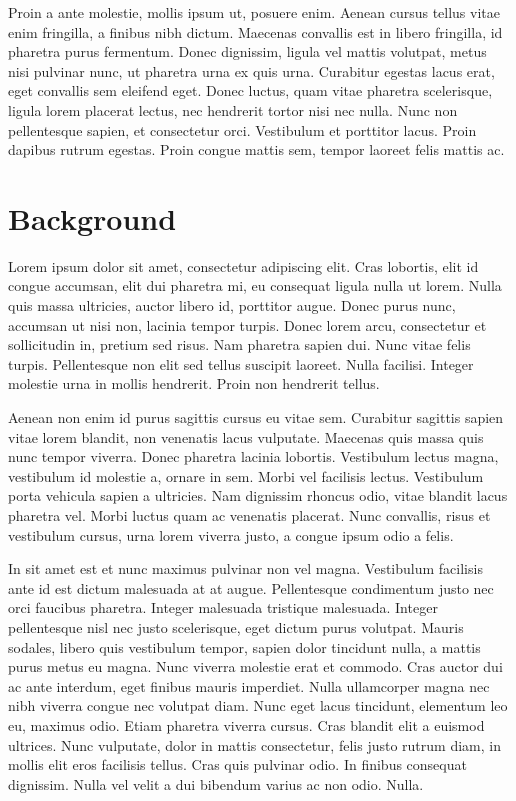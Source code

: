 \documentclass[a4paper]{article}
\begin{document}
Proin a ante molestie, mollis ipsum ut, posuere enim. Aenean cursus tellus vitae enim fringilla, a finibus nibh dictum. Maecenas convallis est in libero fringilla, id pharetra purus fermentum. Donec dignissim, ligula vel mattis volutpat, metus nisi pulvinar nunc, ut pharetra urna ex quis urna. Curabitur egestas lacus erat, eget convallis sem eleifend eget. Donec luctus, quam vitae pharetra scelerisque, ligula lorem placerat lectus, nec hendrerit tortor nisi nec nulla. Nunc non pellentesque sapien, et consectetur orci. Vestibulum et porttitor lacus. Proin dapibus rutrum egestas. Proin congue mattis sem, tempor laoreet felis mattis ac.

\section{Background}



Lorem ipsum dolor sit amet, consectetur adipiscing elit. Cras lobortis, elit id congue accumsan, elit dui pharetra mi, eu consequat ligula nulla ut lorem. Nulla quis massa ultricies, auctor libero id, porttitor augue. Donec purus nunc, accumsan ut nisi non, lacinia tempor turpis. Donec lorem arcu, consectetur et sollicitudin in, pretium sed risus. Nam pharetra sapien dui. Nunc vitae felis turpis. Pellentesque non elit sed tellus suscipit laoreet. Nulla facilisi. Integer molestie urna in mollis hendrerit. Proin non hendrerit tellus.

Aenean non enim id purus sagittis cursus eu vitae sem. Curabitur sagittis sapien vitae lorem blandit, non venenatis lacus vulputate. Maecenas quis massa quis nunc tempor viverra. Donec pharetra lacinia lobortis. Vestibulum lectus magna, vestibulum id molestie a, ornare in sem. Morbi vel facilisis lectus. Vestibulum porta vehicula sapien a ultricies. Nam dignissim rhoncus odio, vitae blandit lacus pharetra vel. Morbi luctus quam ac venenatis placerat. Nunc convallis, risus et vestibulum cursus, urna lorem viverra justo, a congue ipsum odio a felis.

In sit amet est et nunc maximus pulvinar non vel magna. Vestibulum facilisis ante id est dictum malesuada at at augue. Pellentesque condimentum justo nec orci faucibus pharetra. Integer malesuada tristique malesuada. Integer pellentesque nisl nec justo scelerisque, eget dictum purus volutpat. Mauris sodales, libero quis vestibulum tempor, sapien dolor tincidunt nulla, a mattis purus metus eu magna. Nunc viverra molestie erat et commodo. Cras auctor dui ac ante interdum, eget finibus mauris imperdiet. Nulla ullamcorper magna nec nibh viverra congue nec volutpat diam. Nunc eget lacus tincidunt, elementum leo eu, maximus odio. Etiam pharetra viverra cursus. Cras blandit elit a euismod ultrices. Nunc vulputate, dolor in mattis consectetur, felis justo rutrum diam, in mollis elit eros facilisis tellus. Cras quis pulvinar odio. In finibus consequat dignissim. Nulla vel velit a dui bibendum varius ac non odio. Nulla.
\end{document}
